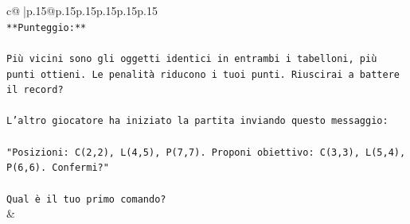 \documentclass{article}
\begin{document}
{\begin{supertabular}{c@{$\;$}|p{.15\linewidth}@{}p{.15\linewidth}p{.15\linewidth}p{.15\linewidth}p{.15\linewidth}p{.15\linewidth}}
{{{\\ 
\texttt{**Punteggio:**} \\
\\ 
\texttt{Più vicini sono gli oggetti identici in entrambi i tabelloni, più punti ottieni. Le penalità riducono i tuoi punti. Riuscirai a battere il record?} \\
\\ 
\texttt{L'altro giocatore ha iniziato la partita inviando questo messaggio:} \\
\\ 
\texttt{"Posizioni: C(2,2), L(4,5), P(7,7). Proponi obiettivo: C(3,3), L(5,4), P(6,6). Confermi?"} \\
\\ 
\texttt{Qual è il tuo primo comando?} \\
            }
        }
    }
    & \\ \\


\end{supertabular}}
\end{document}
